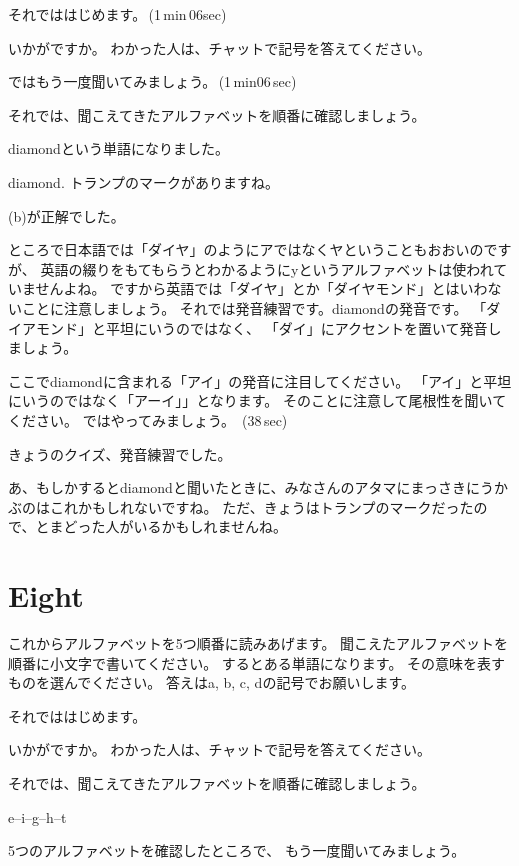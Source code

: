 \documentclass[12pt]{jlreq}
\begin{document}
それでははじめます。\faVolumeUp\,(1\,min\,06sec)

いかがですか。
わかった人は、チャットで記号を答えてください。


ではもう一度聞いてみましょう。\faVolumeUp\,(1\,min06\,sec)

それでは、聞こえてきたアルファベットを順番に確認しましょう。{\large \ComputerMouse}

{\large \ComputerMouse}

diamondという単語になりました。

diamond.
トランプのマークがありますね。

(b)が正解でした。

ところで日本語では「ダイヤ」のようにアではなくヤということもおおいのですが、
英語の綴りをもてもらうとわかるようにyというアルファベットは使われていませんよね。
ですから英語では「ダイヤ」とか「ダイヤモンド」とはいわないことに注意しましょう。
それでは発音練習です。diamondの発音です。
「ダイアモンド」と平坦にいうのではなく、
「ダイ」にアクセントを置いて発音しましょう。

ここでdiamondに含まれる「アイ」の発音に注目してください。
「アイ」と平坦にいうのではなく「アーイ」」となります。
そのことに注意して尾根性を聞いてください。
ではやってみましょう。
\faVolumeUp\,(38\,sec)

きょうのクイズ、発音練習でした。

{\large \ComputerMouse}

あ、もしかするとdiamondと聞いたときに、みなさんのアタマにまっさきにうかぶのはこれかもしれないですね。
ただ、きょうはトランプのマークだったので、とまどった人がいるかもしれませんね。
\section{Eight}
これからアルファベットを5つ順番に読みあげます。
聞こえたアルファベットを順番に小文字で書いてください。
するとある単語になります。
その意味を表すものを選んでください。
答えはa, b, c, dの記号でお願いします。

それでははじめます。

いかがですか。
わかった人は、チャットで記号を答えてください。

それでは、聞こえてきたアルファベットを順番に確認しましょう。{\large \ComputerMouse}

e--i--g--h--t

5つのアルファベットを確認したところで、
もう一度聞いてみましょう。
\end{document}

